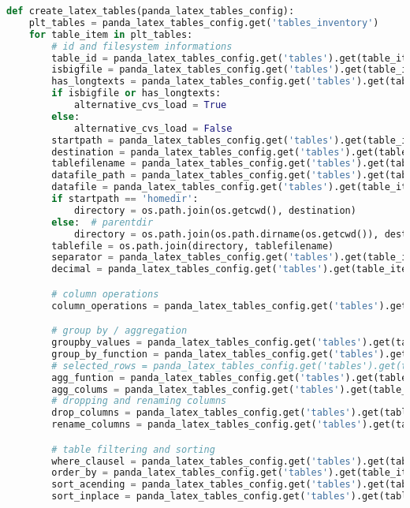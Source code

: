 \begin{lstlisting}[language=python, caption=Python LaTex - pandas\_dataframe\_to\_latex\_table.py CSV - LaTex Tabelle,captionpos=b,label={lst:Python LaTex - pandas_dataframe_to_latex_table},breaklines=true]
def create_latex_tables(panda_latex_tables_config):
    plt_tables = panda_latex_tables_config.get('tables_inventory')
    for table_item in plt_tables:
        # id and filesystem informations
        table_id = panda_latex_tables_config.get('tables').get(table_item).get('id')
        isbigfile = panda_latex_tables_config.get('tables').get(table_item).get('isbigfile')
        has_longtexts = panda_latex_tables_config.get('tables').get(table_item).get('has_longtexts')
        if isbigfile or has_longtexts:
            alternative_cvs_load = True
        else:
            alternative_cvs_load = False
        startpath = panda_latex_tables_config.get('tables').get(table_item).get('startpath')
        destination = panda_latex_tables_config.get('tables').get(table_item).get('destination_path')
        tablefilename = panda_latex_tables_config.get('tables').get(table_item).get('tablefilename')
        datafile_path = panda_latex_tables_config.get('tables').get(table_item).get('datafile_path')
        datafile = panda_latex_tables_config.get('tables').get(table_item).get('datafile')
        if startpath == 'homedir':
            directory = os.path.join(os.getcwd(), destination)
        else:  # parentdir
            directory = os.path.join(os.path.dirname(os.getcwd()), destination)
        tablefile = os.path.join(directory, tablefilename)
        separator = panda_latex_tables_config.get('tables').get(table_item).get('separator')
        decimal = panda_latex_tables_config.get('tables').get(table_item).get('decimal')

        # column operations
        column_operations = panda_latex_tables_config.get('tables').get(table_item).get('column_operations').get('datas')

        # group by / aggregation
        groupby_values = panda_latex_tables_config.get('tables').get(table_item).get('group_by')
        group_by_function = panda_latex_tables_config.get('tables').get(table_item).get('group_by_function')
        # selected_rows = panda_latex_tables_config.get('tables').get(table_item).get('selected_rows')
        agg_funtion = panda_latex_tables_config.get('tables').get(table_item).get('agg_funtion')
        agg_colums = panda_latex_tables_config.get('tables').get(table_item).get('agg_colums')
        # dropping and renaming columns
        drop_columns = panda_latex_tables_config.get('tables').get(table_item).get('drop_columns')
        rename_columns = panda_latex_tables_config.get('tables').get(table_item).get('rename_columns')

        # table filtering and sorting
        where_clausel = panda_latex_tables_config.get('tables').get(table_item).get('where_clausel')
        order_by = panda_latex_tables_config.get('tables').get(table_item).get('sorting').get('order_by')
        sort_acending = panda_latex_tables_config.get('tables').get(table_item).get('sorting').get('sort_acending')
        sort_inplace = panda_latex_tables_config.get('tables').get(table_item).get('sorting').get('sort_inplace')


\end{lstlisting}
